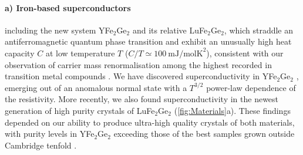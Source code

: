 \paragraph {a) Iron-based superconductors} including the new system YFe$_2$Ge$_2$ and its relative LuFe$_2$Ge$_2$, which straddle an antiferromagnetic quantum phase transition and exhibit  an unusually high heat capacity $C$ at low temperature $T$ ($C/T \simeq 100~\text{mJ/molK}^2$), consistent with our observation of carrier mass renormalisation among the highest recorded in transition metal compounds . 
We have discovered superconductivity in YFe$_2$Ge$_2$ , emerging out of an anomalous normal state with a %
$T^{3/2}$ power-law dependence of the resistivity. 
More recently, we also found superconductivity in the newest generation of high purity crystals of LuFe$_2$Ge$_2$ (\autoref{fig:Materials}a). 
These findings depended on our ability to produce ultra-high quality crystals of both materials, with purity levels in YFe$_2$Ge$_2$ exceeding those of the best samples grown outside Cambridge tenfold . %

%

